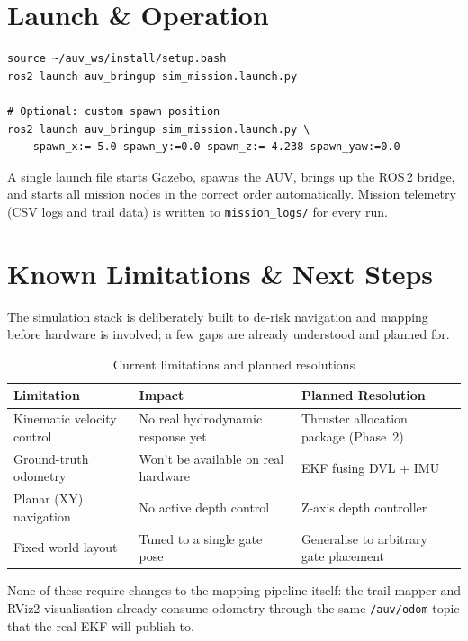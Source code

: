 \documentclass[11pt,a4paper]{article}
\begin{document}
\section{Launch \& Operation}

\begin{lstlisting}[style=cleanbash, caption={Full mission launch}]
source ~/auv_ws/install/setup.bash
ros2 launch auv_bringup sim_mission.launch.py

# Optional: custom spawn position
ros2 launch auv_bringup sim_mission.launch.py \
    spawn_x:=-5.0 spawn_y:=0.0 spawn_z:=-4.238 spawn_yaw:=0.0
\end{lstlisting}

A single launch file starts Gazebo, spawns the AUV, brings up the ROS\,2
bridge, and starts all mission nodes in the correct order automatically.
Mission telemetry (CSV logs and trail data) is written to
\texttt{mission\_logs/} for every run.

\section{Known Limitations \& Next Steps}

The simulation stack is deliberately built to de-risk navigation and mapping
before hardware is involved; a few gaps are already understood and planned for.

\begin{table}[H]
\centering
\caption{Current limitations and planned resolutions}
\begin{tabular}{L{3.6cm} L{4.6cm} L{4.4cm}}
  \toprule
  \textbf{Limitation} & \textbf{Impact} & \textbf{Planned Resolution} \\
  \midrule
  Kinematic velocity control & No real hydrodynamic response yet & Thruster allocation package (Phase~2) \\
  Ground-truth odometry & Won't be available on real hardware & EKF fusing DVL + IMU \\
  Planar (XY) navigation & No active depth control & Z-axis depth controller \\
  Fixed world layout & Tuned to a single gate pose & Generalise to arbitrary gate placement \\
  \bottomrule
\end{tabular}
\end{table}

None of these require changes to the mapping pipeline itself: the trail
mapper and RViz2 visualisation already consume odometry through the same
\texttt{/auv/odom} topic that the real EKF will publish to.
\end{document}

